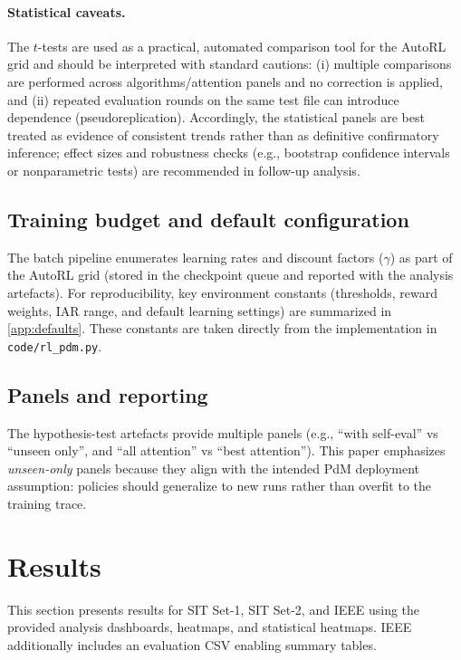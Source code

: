 \documentclass[11pt]{article}
\begin{document}
\paragraph{Statistical caveats.}
The $t$-tests are used as a practical, automated comparison tool for the AutoRL grid and should be interpreted with standard cautions: (i) multiple comparisons are performed across algorithms/attention panels and no correction is applied, and (ii) repeated evaluation rounds on the same test file can introduce dependence (pseudoreplication). Accordingly, the statistical panels are best treated as evidence of consistent trends rather than as definitive confirmatory inference; effect sizes and robustness checks (e.g., bootstrap confidence intervals or nonparametric tests) are recommended in follow-up analysis.

\subsection{Training budget and default configuration}
The batch pipeline enumerates learning rates and discount factors ($\gamma$) as part of the AutoRL grid (stored in the checkpoint queue and reported with the analysis artefacts). For reproducibility, key environment constants (thresholds, reward weights, IAR range, and default learning settings) are summarized in \cref{app:defaults}. These constants are taken directly from the implementation in \texttt{code/rl\_pdm.py}.

\subsection{Panels and reporting}
The hypothesis-test artefacts provide multiple panels (e.g., ``with self-eval'' vs ``unseen only'', and ``all attention'' vs ``best attention''). This paper emphasizes \emph{unseen-only} panels because they align with the intended PdM deployment assumption: policies should generalize to new runs rather than overfit to the training trace.

\section{Results}
\label{sec:results}
This section presents results for SIT Set-1, SIT Set-2, and IEEE using the provided analysis dashboards, heatmaps, and statistical heatmaps. IEEE additionally includes an evaluation CSV enabling summary tables.
\end{document}
